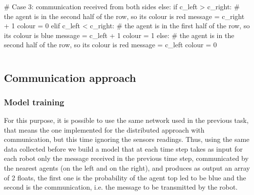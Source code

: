 \begin{python}
	# Case 3: communication received from both sides
	else:
		if c_left > c_right:
			# the agent is in the second half of the row, so its colour is red
			message = c_right + 1
			colour = 0
		elif c_left < c_right:
			# the agent is in the first half of the row, so its colour is blue
			message = c_left + 1
			colour = 1
		else:
			# the agent is in the second half of the row, so its colour is red
			message = c_left
			colour = 0
\end{python}

\begin{lstlisting}[frame=none,caption=Protocol used from the manual controller 
to decide for each robot the message to transmit and the colour., 
label=lst:manualtask2]
\end{lstlisting}


\subsection{Communication approach}
\label{subsec:task2comm}

\subsubsection{Model training}
\label{subsubsec:learnedcomm2}
For this purpose, it is possible to use the same network used in the previous task, 
that means the one implemented for the distributed approach with 
communication, but this time ignoring the sensors readings.
Thus, using the same data collected before we build a model that at each time 
step takes as input for each robot only the message received in the previous time 
step, communicated by the nearest agents (on the left and on the right), and 
produces as output an array of 2 floats, the first one is the probability of the agent 
top \gls{led} to be blue and the second is the communication, i.e. the message to 
be transmitted by the robot.

